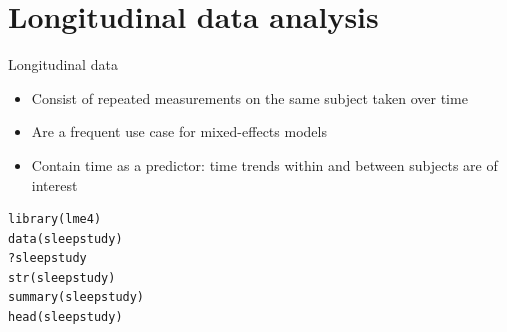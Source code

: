 \documentclass[aspectratio=169]{beamer}
\newcommand{\vect}[1]{\mathbf{#1}}
\newcommand{\mat}[1]{\mathbf{#1}}
\newcommand{\gvect}[1]{\boldsymbol{#1}}
\newcommand{\gmat}[1]{\boldsymbol{#1}}
\begin{document}

\section{Longitudinal data analysis}

\begin{frame}[fragile]{Longitudinal data}
  \begin{itemize}
    \item Consist of repeated measurements on the same subject taken over time
    \item Are a frequent use case for mixed-effects models
    \item Contain time as a predictor:
          time trends within and between subjects are of interest
  \end{itemize}
  \begin{lstlisting}
library(lme4)
data(sleepstudy)
?sleepstudy
str(sleepstudy)
summary(sleepstudy)
head(sleepstudy)
  \end{lstlisting}
\nocite{Bates2010lme4, Bates2015}
\end{frame}
\end{document}
